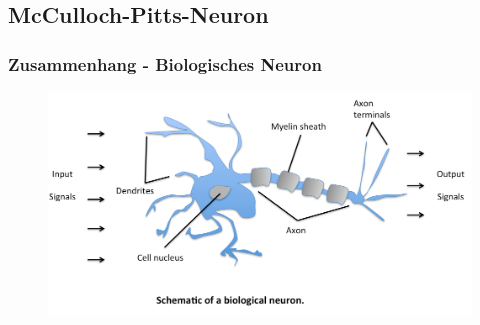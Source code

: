 \subsection{McCulloch-Pitts-Neuron }

\begin{frame}
\frametitle{Zusammenhang - Biologisches Neuron}

\begin{figure}
\includegraphics[width=\linewidth]{./geschichtliches/mcCullochPittsNeuron/img/bioNeuron_alpha}
\end{figure}


\end{frame}



